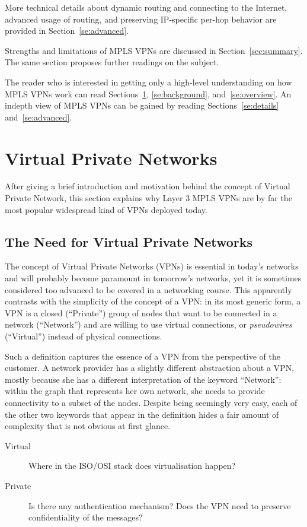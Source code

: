 \documentclass{article}
\begin{document}
More technical details about dynamic routing and connecting to the Internet, 
advanced usage of routing, and preserving IP-specific per-hop behavior are 
provided in Section~\ref{se:advanced}. 


Strengths and limitations of MPLS VPNs are discussed in Section~\ref{sec:summary}. The
same section proposes further readings on the subject.

The reader who is interested in getting only a high-level understanding on how MPLS VPNs work can
read Sections~\ref{se:intro}, \ref{se:background}, and~\ref{se:overview}. An indepth view
of MPLS VPNs can be gained by reading Sections~\ref{se:details} and~\ref{se:advanced}.

\section{Virtual Private Networks}\label{se:intro}

After giving a brief introduction and motivation behind the concept of Virtual 
Private Network, this section explains why Layer 3 MPLS VPNs are by far the most 
popular widespread kind of VPNs deployed today.


\subsection{The Need for Virtual Private Networks}
The concept of Virtual Private Networks (VPNs) is essential in today's 
networks and will probably become paramount in tomorrow's networks, yet it is 
sometimes considered too advanced to be covered in a networking course. This 
apparently contrasts with the simplicity of the concept of a VPN: in its most 
generic form, a VPN is a closed (``Private'') group of nodes
that want to be connected in a network (``Network'') and are willing to use 
virtual connections, or \emph{pseudowires} (``Virtual'') instead of physical 
connections. 

Such a definition captures the essence of a VPN from the perspective of the 
customer. A network provider has a slightly different abstraction about a VPN, 
mostly because she has a different interpretation of the keyword ``Network'': 
within the graph that represents her own network, she needs to provide 
connectivity to a subset of the nodes. Despite being seemingly very easy, each 
of the other two keywords that appear in the definition hides a fair amount of 
complexity that is not obvious at first glance. 
\begin{description}
 \item[Virtual] Where in the ISO/OSI stack does virtualisation happen?
 \item[Private] Is there any authentication mechanism? Does the VPN
need to preserve confidentiality of the messages?
 \end{description}
\end{document}
